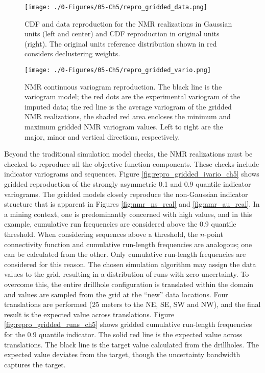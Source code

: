 \begin{figure}[htb!]
    \centering
    \texttt{[image: ./0-Figures/05-Ch5/repro\_gridded\_data.png]}
    \caption{\Gls{CDF} and data reproduction for the \gls{NMR} realizations in Gaussian units (left and center) and \gls{CDF} reproduction in original units (right). The original units reference distribution shown in red considers declustering weights.}
    \label{fig:repro_gridded_data_ch5}
\end{figure}

\begin{figure}[htb!]
    \centering
    \texttt{[image: ./0-Figures/05-Ch5/repro\_gridded\_vario.png]}
    \caption{\gls{NMR} continuous variogram reproduction. The black line is the variogram model; the red dots are the experimental variogram of the imputed data; the red line is the average variogram of the gridded \gls{NMR} realizations, the shaded red area encloses the minimum and maximum gridded \gls{NMR} variogram values. Left to right are the major, minor and vertical directions, respectively.}
    \label{fig:repro_gridded_vario_ch5}
\end{figure}

Beyond the traditional simulation model checks, the \gls{NMR} realizations must be checked to reproduce all the objective function components. These checks include indicator variograms and sequences. Figure \ref{fig:repro_gridded_ivario_ch5} shows gridded reproduction of the strongly asymmetric 0.1 and 0.9 quantile indicator variograms. The gridded models closely reproduce the non-Gaussian indicator structure that is apparent in Figures \ref{fig:nmr_ns_real} and \ref{fig:nmr_au_real}. In a mining context, one is predominantly concerned with high values, and in this example, cumulative run frequencies are considered above the 0.9 quantile threshold. When considering sequences above a threshold, the $n$-point connectivity function and cumulative run-length frequencies are analogous; one can be calculated from the other. Only cumulative run-length frequencies are considered for this reason. The chosen simulation algorithm may assign the data values to the grid, resulting in a distribution of runs with zero uncertainty. To overcome this, the entire drillhole configuration is translated within the domain and values are sampled from the grid at the ``new'' data locations. Four translations are performed (25 meters to the NE, SE, SW and NW), and the final result is the expected value across translations. Figure \ref{fig:repro_gridded_runs_ch5} shows gridded cumulative run-length frequencies for the 0.9 quantile indicator. The solid red line is the expected value across translations. The black line is the target value calculated from the drillholes. The expected value deviates from the target, though the uncertainty bandwidth captures the target.

